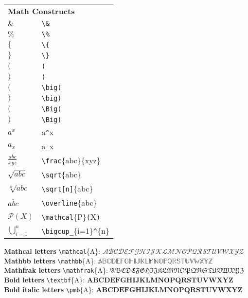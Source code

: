 \documentclass[12pt,a4paper]{article}
\begin{document}
\begin{tabular}[t]{ll}
\multicolumn{2}{l}{\textbf{Math Constructs}} \\
$\&$ & \verb$\&$ \\
$\%$ & \verb$\%$ \\
$\{$ & \verb$\{$ \\
$\}$ & \verb$\}$ \\
$($ & \verb$($ \\
$)$ & \verb$)$ \\
$\big($ & \verb$\big($ \\
$\big)$ & \verb$\big)$ \\
$\Big($ & \verb$\Big($ \\
$\Big)$ & \verb$\Big)$ \\
$a^x$ & a\verb $^$x \\
$a_x$ & a\verb $_$x \\
$\frac{abc}{xyz}$ & \verb$\frac$\{abc\}\{xyz\} \\
$\sqrt{abc}$ & \verb$\sqrt$\{abc\} \\
$\sqrt[n]{abc}$ & \verb$\sqrt[n]$\{abc\} \\
$\overline{abc}$ & \verb$\overline$\{abc\} \\
$\mathcal{P}(X)$ & \verb$\mathcal$\{P\}\verb$($X\verb$)$ \\
$\bigcup\limits_{i=1}^{n}$ & \verb$\bigcup_$\{i=1\}\verb $^$\{n\} \\
\end{tabular}

\textbf{Mathcal letters} \verb$\mathcal$\{A\}: $\mathcal{ABCDEFGHIJKLMNOPQRSTUVWXYZ}$ \\
\textbf{Mathbb letters} \verb$\mathbb$\{A\}: $\mathbb{ABCDEFGHIJKLMNOPQRSTUVWXYZ}$ \\
\textbf{Mathfrak letters} \verb$\mathfrak$\{A\}: $\mathfrak{ABCDEFGHIJKLMNOPQRSTUVWXYZ}$ \\
\textbf{Bold letters} \verb$\textbf$\{A\}: $\textbf{ABCDEFGHIJKLMNOPQRSTUVWXYZ}$ \\
\textbf{Bold italic letters} \verb$\pmb$\{A\}: $\pmb{ABCDEFGHIJKLMNOPQRSTUVWXYZ}$
\end{document}
